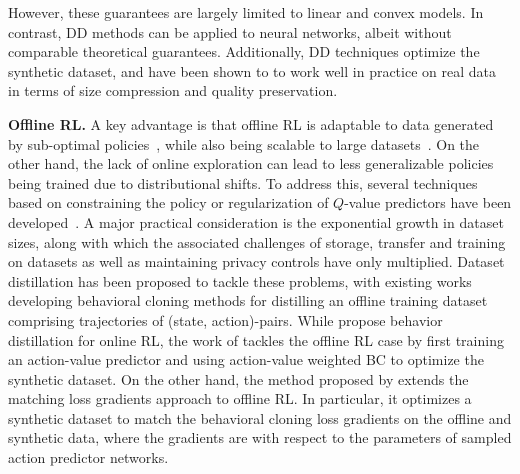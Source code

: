 However, these guarantees are largely limited to linear and convex models. In contrast, DD methods can be applied to neural networks, albeit without comparable theoretical guarantees. Additionally, DD techniques optimize the synthetic dataset, and have been shown to to work well in practice on real data in terms of size compression and quality preservation. 


{\bf Offline RL.} 
A key advantage is that 
offline RL is adaptable to data generated by sub-optimal policies~\citep{levine2020offlinereinforcementlearningtutorial,fu2021d4rldatasetsdeepdatadriven}, while also being scalable to large datasets~\citep{Lange2012}. On the other hand, the lack of online exploration can lead to less generalizable policies being trained due to distributional shifts. To address this, several techniques based on constraining the policy \citep{fujimoto2021a,tarasov2023revisiting} or regularization  of $Q$-value predictors have been developed~\citep{Kumaretal20,kostrikov2022offline}. A major practical consideration is the exponential growth in dataset sizes, along with which the associated challenges of storage, transfer and training on datasets as well as maintaining privacy controls have only multiplied. Dataset distillation has been proposed to tackle these problems, with existing works developing behavioral cloning methods for distilling an offline training dataset comprising trajectories of (state, action)-pairs. While \cite{lupu2024behaviour} propose behavior distillation for online RL, the work of \cite{lei2024offline} tackles the offline RL case by first training an action-value predictor and using action-value weighted BC to optimize the synthetic dataset. On the other hand, the method proposed by \cite{light2024datasetdistillationofflinereinforcement} extends the matching loss gradients approach to offline RL. In particular, it optimizes a synthetic dataset to match the behavioral cloning loss gradients on the offline and synthetic data, where the gradients are with respect to the parameters of sampled action predictor networks. 

